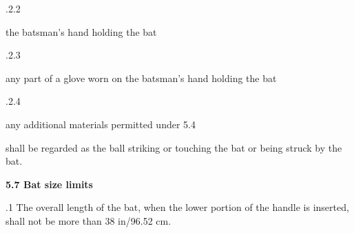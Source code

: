 \documentclass[12pt]{article}
\begin{document}
\vspace{\baselineskip}
\begin{adjustwidth}{0.49in}{0.0in}
{\fontsize{9pt}{10.8pt}.2.2 \tabto{1.17in} {\fontsize{8pt}{9.6pt}\selectfont the batsman’s hand holding the bat\par}\par}\par

\end{adjustwidth}


\vspace{\baselineskip}
\begin{adjustwidth}{0.49in}{0.0in}
{\fontsize{9pt}{10.8pt}.2.3 \tabto{1.17in} {\fontsize{8pt}{9.6pt}\selectfont any part of a glove worn on the batsman’s hand holding the bat\par}\par}\par

\end{adjustwidth}


\vspace{\baselineskip}
\begin{adjustwidth}{0.49in}{0.0in}
{\fontsize{9pt}{10.8pt}.2.4 \tabto{1.17in} {\fontsize{8pt}{9.6pt}\selectfont any additional materials permitted under 5.4\par}\par}\par

\end{adjustwidth}


\vspace{\baselineskip}
\begin{adjustwidth}{0.5in}{0.0in}
{\fontsize{9pt}{10.8pt}\selectfont shall be regarded as the ball striking or touching the bat or being struck by the bat.\par}\par

\end{adjustwidth}


\vspace{\baselineskip}
{\fontsize{11pt}{13.2pt}\selectfont \textbf{5.7 \tabto{0.47in} Bat size limits}\par}\par


\vspace{\baselineskip}
\begin{adjustwidth}{0.5in}{0.28in}
{\fontsize{9pt}{10.8pt}.1 \tabto{0.49in} The overall length of the bat, when the lower portion of the handle is inserted, shall not be more than 38 in/96.52 cm.\par}\par

\end{adjustwidth}
\end{document}
